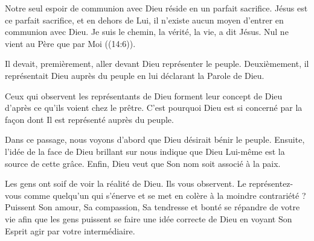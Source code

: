 Notre seul espoir de communion avec Dieu réside en un parfait sacrifice.
 Jésus est ce parfait sacrifice, et en dehors de Lui,
 il n'existe aucun moyen d'entrer en communion avec Dieu.
 \og Je suis le chemin, la vérité, la vie, a dit Jésus.
 Nul ne vient au Père que par Moi \fg{} ((14:6)). 

\dvrule






 Il devait, premièrement, aller devant Dieu représenter le peuple.
 Deuxièmement, il représentait Dieu auprès du peuple
 en lui déclarant la Parole de Dieu. 


Ceux qui observent les représentants de Dieu forment leur concept de Dieu
 d'après ce qu'ils voient chez le prêtre.
 C'est pourquoi Dieu est si concerné par la façon dont Il est représenté
 auprès du peuple. 

Dans ce passage, nous voyons d'abord que Dieu désirait bénir le peuple.
 Ensuite, l'idée de la face de Dieu brillant sur nous indique
 que Dieu Lui-même est la source de cette grâce.
 Enfin, Dieu veut que Son nom soit associé à la paix. 

Les gens ont soif de voir la réalité de Dieu. Ils vous observent.
 Le représentez-vous comme quelqu'un qui s'énerve et se met en colère
 à la moindre contrariété ? Puissent Son amour, Sa compassion,
 Sa tendresse et bonté se répandre de votre vie afin que les gens
 puissent se faire une idée correcte de Dieu en voyant
 Son Esprit agir par votre intermédiaire. 

